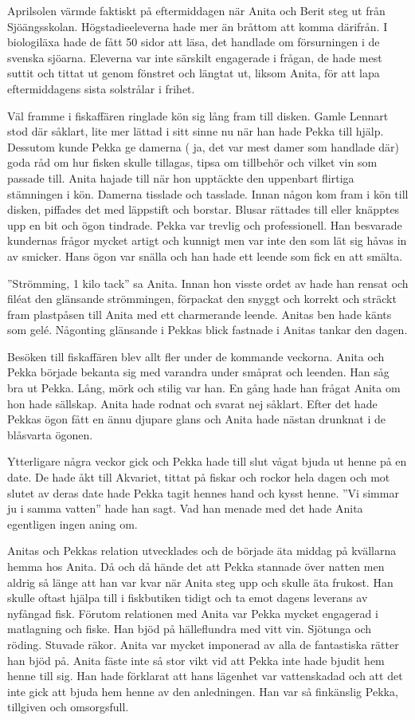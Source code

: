 Aprilsolen värmde faktiskt på eftermiddagen när Anita och Berit steg ut från Sjöängsskolan. Högstadieeleverna hade mer än bråttom att komma därifrån. I biologiläxa hade de fått 50 sidor att läsa, det handlade om försurningen i de svenska sjöarna. Eleverna var inte särskilt engagerade i frågan, de hade mest suttit och tittat ut genom fönstret och längtat ut, liksom Anita, för att lapa eftermiddagens sista solstrålar i frihet. 

Väl framme i fiskaffären ringlade kön sig lång fram till disken. Gamle Lennart stod där såklart, lite mer lättad i sitt sinne nu när han hade Pekka till hjälp. Dessutom kunde Pekka ge damerna ( ja, det var mest damer som handlade där) goda råd om hur fisken skulle tillagas, tipsa om tillbehör och vilket vin som passade till. Anita hajade till när hon upptäckte den uppenbart flirtiga stämningen i kön. Damerna tisslade och tasslade. Innan någon kom fram i kön till disken, piffades det med läppstift och borstar. Blusar rättades till eller knäpptes upp en bit och ögon tindrade. Pekka var trevlig och professionell. Han besvarade kundernas frågor mycket artigt och kunnigt men var inte den som lät sig håvas in av smicker. Hans ögon var snälla och han hade ett leende som fick en att smälta. 

”Strömming, 1 kilo tack” sa Anita. Innan hon visste ordet av hade han rensat och filéat den glänsande strömmingen,  förpackat den snyggt och korrekt och sträckt fram plastpåsen till Anita med ett charmerande leende. Anitas ben hade känts som gelé. Någonting glänsande i Pekkas blick fastnade i Anitas tankar den dagen. 

Besöken till fiskaffären blev allt fler under de kommande veckorna. Anita och Pekka började bekanta sig med varandra under småprat och leenden. Han såg bra ut Pekka. Lång, mörk och stilig var han.  En gång hade han frågat Anita om hon hade sällskap. Anita hade rodnat och svarat nej såklart. Efter det hade Pekkas ögon fått en ännu djupare glans och Anita hade nästan drunknat i de blåsvarta ögonen. 

Ytterligare några veckor gick och Pekka hade till slut vågat bjuda ut henne på en date. De hade åkt till Akvariet, tittat på fiskar och rockor hela dagen och mot slutet av deras date hade Pekka tagit hennes hand och kysst henne. ”Vi simmar ju i samma vatten” hade han sagt. Vad han menade med det hade Anita egentligen ingen aning om.

Anitas och Pekkas relation utvecklades och de började äta middag på kvällarna hemma hos Anita. Då och då hände det att Pekka stannade över natten men aldrig så länge att han var kvar när Anita steg upp och skulle äta frukost. Han skulle oftast hjälpa till i fiskbutiken tidigt och ta emot dagens leverans av nyfångad fisk. Förutom relationen med Anita var Pekka mycket engagerad i matlagning och fiske. Han bjöd på hälleflundra med vitt vin. Sjötunga och röding. Stuvade räkor. Anita var mycket imponerad av alla de fantastiska rätter han bjöd på. Anita fäste inte så stor vikt vid att Pekka inte hade bjudit hem henne till sig. Han hade förklarat att hans lägenhet var vattenskadad och att det inte gick att bjuda hem henne av den anledningen. Han var så finkänslig Pekka, tillgiven och omsorgsfull.

